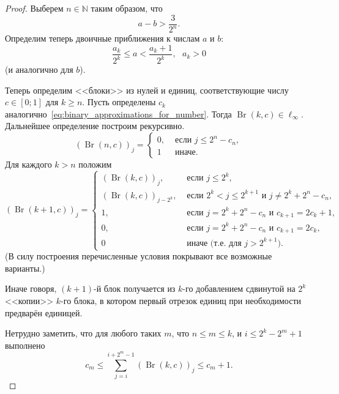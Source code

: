 \documentclass[a4paper,14pt]{article} %
\theoremstyle{plain}
\theoremstyle{definition}
\begin{document}
\begin{proof}
	Выберем $n\in\mathbb{N}$ таким образом, что
	\begin{equation}
		\label{eq:Omega_a_b_gap}
		a - b > \frac{3}{2^n}
		.
	\end{equation}
	Определим теперь двоичные приближения к числам $a$ и $b$:
	\begin{equation}
		\label{eq:binary_approximations_for_number}
		\frac{a_k}{2^k} \leq a < \frac{a_k+1}{2^k}
		,
		~~~a_k>0
	\end{equation}
	(и аналогично для $b$).


	Теперь определим <<блоки>> из нулей и единиц, соответствующие числу $c\in[0;1]$ для $k \geq n$.
	Пусть определены $c_k$ аналогично~\eqref{eq:binary_approximations_for_number}.
	Тогда $\operatorname{Br}(k,c) \in \ell_\infty$.
	Дальнейшее определение построим рекурсивно.
	\begin{equation}
		(\operatorname{Br}(n,c))_j = \begin{cases}
			0, & \mbox{~если~} j \leq 2^n - c_n,
			\\
			1  & \mbox{~иначе}
			.
		\end{cases}
	\end{equation}
	Для каждого $k > n$ положим
	\begin{equation}
		(\operatorname{Br}(k+1,c))_j = \begin{cases}
			(\operatorname{Br}(k,c))_j, &  \mbox{~если~} j \leq 2^k,
			\\
			(\operatorname{Br}(k,c))_{j-2^k}, &  \mbox{~если~} 2^k < j \leq 2^{k+1} \mbox{~и~} j \neq 2^k + 2^n - c_n,
			\\
			1, & \mbox{~если~} j = 2^k + 2^n - c_n \mbox{~и~} c_{k+1} = 2 c_k + 1,
			\\
			0, & \mbox{~если~} j = 2^k + 2^n - c_n \mbox{~и~} c_{k+1} = 2 c_k,
			\\
			0  & \mbox{~иначе (т.е. для $j > 2^{k+1}$)}
			.
		\end{cases}
	\end{equation}
	(В силу построения перечисленные условия покрывают все возможные варианты.)

	Иначе говоря, $(k+1)$-й блок получается из $k$-го добавлением сдвинутой на $2^k$ <<копии>> $k$-го блока,
	в котором первый отрезок единиц при необходимости предварён единицей.

	Нетрудно заметить, что для любого таких $m$, что $n \leq m \leq k$, и $ i \leq 2^k - 2^m + 1$
	выполнено
	\begin{equation}
		c_m \leq \sum_{j=i}^{i+2^m-1} (\operatorname{Br}(k,c))_j \leq c_{m}+1
		.
	\end{equation}



\end{proof}
\end{document}
